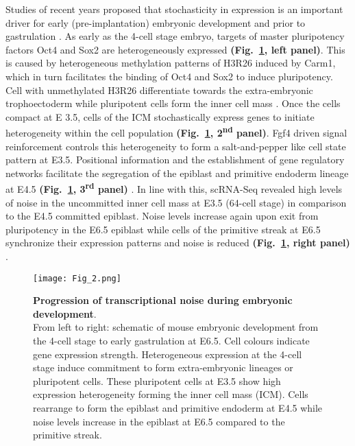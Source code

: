 Studies of recent years proposed that stochasticity in expression is an important driver for early (pre-implantation) embryonic development and prior to gastrulation \citep{Dietrich2007}. As early as the 4-cell stage embryo, targets of master pluripotency factors \gls{Oct4} and \gls{Sox2} are heterogeneously expressed \textbf{(Fig.~\ref{fig0:noise_development}, left panel)}. This is caused by heterogeneous methylation patterns of \gls{H3R26} induced by \gls{Carm1}, which in turn facilitates the binding of Oct4 and Sox2 to induce pluripotency. Cell with unmethylated H3R26 differentiate towards the extra-embryonic trophoectoderm while pluripotent cells form the inner cell mass \citep{Goolam2016}. Once the cells compact at \gls{E} 3.5, cells of the \gls{ICM} stochastically express genes to initiate heterogeneity within the cell population \textbf{(Fig.~\ref{fig0:noise_development}, 2\textsuperscript{nd} panel)}. Fgf4 driven signal reinforcement controls this heterogeneity to form a salt-and-pepper like cell state pattern at E3.5. Positional information and the establishment of gene regulatory networks facilitate the segregation of the epiblast and primitive endoderm lineage at E4.5 \textbf{(Fig.~\ref{fig0:noise_development}, 3\textsuperscript{rd} panel)} \citep{Ohnishi2014}. In line with this, scRNA-Seq revealed high levels of noise in the uncommitted inner cell mass at E3.5 (64-cell stage) in comparison to the E4.5 committed epiblast. Noise levels increase again upon exit from pluripotency in the E6.5 epiblast while cells of the primitive streak at E6.5 synchronize their expression patterns and noise is reduced \textbf{(Fig.~\ref{fig0:noise_development}, right panel)} \citep{Mohammed2017}.

\begin{figure}[!h]
\centering
\texttt{[image: Fig\_2.png]}
\caption[Progression of transcriptional heterogeneity during embryonic development]{\textbf{Progression of transcriptional noise during embryonic development}.\\
From left to right: schematic of mouse embryonic development from the 4-cell stage to early gastrulation at E6.5. Cell colours indicate gene expression strength. Heterogeneous expression at the 4-cell stage induce commitment to form extra-embryonic lineages or pluripotent cells. These pluripotent cells at E3.5 show high expression heterogeneity forming the inner cell mass (ICM). Cells rearrange to form the epiblast and primitive endoderm at E4.5 while noise levels increase in the epiblast at E6.5 compared to the primitive streak.}
\label{fig0:noise_development}
\end{figure}

